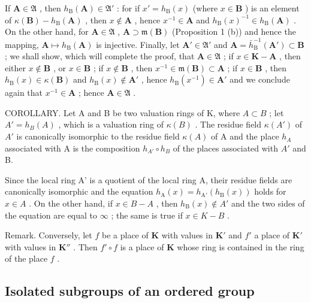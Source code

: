 If \(\mathbf{A} \in \mathfrak{A}\) , then \(h_{\mathrm{B}}(\mathbf{A}) \in \mathfrak{A}'\) : for if \(x' = h_{\mathrm{B}}(x)\) (where \(x \in \mathbf{B}\) ) is an element of \(\kappa(\mathbf{B}) - h_{\mathrm{B}}(\mathbf{A})\) , then \(x \notin \mathbf{A}\) , hence \(x^{-1} \in \mathbf{A}\) and \(h_{\mathrm{B}}(x)^{-1} \in h_{\mathrm{B}}(\mathbf{A})\) . On the other hand, for \(\mathbf{A} \in \mathfrak{A}\) , \(\mathbf{A} \supset \mathfrak{m}(\mathbf{B})\) (Proposition 1 (b)) and hence the mapping, \(\mathbf{A} \mapsto h_{\mathrm{B}}(\mathbf{A})\) is injective. Finally, let \(\mathbf{A}' \in \mathfrak{A}'\) and \(\mathbf{A} = \bar{h}_{\mathrm{B}}^{-1}(\mathbf{A}') \subset \mathbf{B}\) ; we shall show, which will complete the proof, that \(\mathbf{A} \in \mathfrak{A}\) ; if \(x \in \mathbf{K} - \mathbf{A}\) , then either \(x \notin \mathbf{B}\) , or \(x \in \mathbf{B}\) ; if \(x \notin \mathbf{B}\) , then \(x^{-1} \in \mathfrak{m}(\mathbf{B}) \subset \mathbf{A}\) ; if \(x \in \mathbf{B}\) , then \(h_{\mathrm{B}}(x) \in \kappa(\mathbf{B})\) and \(h_{\mathrm{B}}(x) \notin \mathbf{A}'\) , hence \(h_{\mathrm{B}}(x^{-1}) \in \mathbf{A}'\) and we conclude again that \(x^{-1} \in \mathbf{A}\) ; hence \(\mathbf{A} \in \mathfrak{A}\) .

COROLLARY. Let A and B be two valuation rings of K, where \(A \subset B\) ; let \(A' = h_{B}(A)\) , which is a valuation ring of \(\kappa(B)\) . The residue field \(\kappa(A')\) of \(A'\) is canonically isomorphic to the residue field \(\kappa(A)\) of A and the place \(h_{A}\) associated with A is the composition \(h_{A'} \circ h_{B}\) of the places associated with \(A'\) and B.

Since the local ring A' is a quotient of the local ring A, their residue fields are canonically isomorphic and the equation \(h_{\mathrm{A}}(x) = h_{\mathrm{A}'}(h_{\mathrm{B}}(x))\) holds for \(x \in A\) . On the other hand, if \(x \in B - A\) , then \(h_{\mathrm{B}}(x) \notin A'\) and the two sides of the equation are equal to \(\infty\) ; the same is true if \(x \in K - B\) .

Remark. Conversely, let \(f\) be a place of \(\mathbf{K}\) with values in \(\mathbf{K}'\) and \(f'\) a place of \(\mathbf{K}'\) with values in \(\mathbf{K}''\) . Then \(f' \circ f\) is a place of \(\mathbf{K}\) whose ring is contained in the ring of the place \(f\) .

\subsection{Isolated subgroups of an ordered group}

